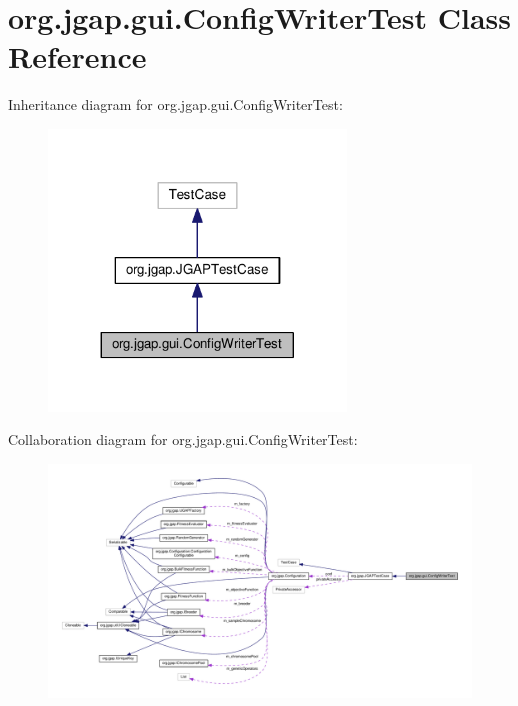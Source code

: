 \hypertarget{classorg_1_1jgap_1_1gui_1_1_config_writer_test}{\section{org.\-jgap.\-gui.\-Config\-Writer\-Test Class Reference}
\label{classorg_1_1jgap_1_1gui_1_1_config_writer_test}
}


Inheritance diagram for org.\-jgap.\-gui.\-Config\-Writer\-Test\-:
\nopagebreak
\begin{figure}[H]
\begin{center}
\leavevmode
\includegraphics[width=224pt]{classorg_1_1jgap_1_1gui_1_1_config_writer_test__inherit__graph}
\end{center}
\end{figure}


Collaboration diagram for org.\-jgap.\-gui.\-Config\-Writer\-Test\-:
\nopagebreak
\begin{figure}[H]
\begin{center}
\leavevmode
\includegraphics[width=350pt]{classorg_1_1jgap_1_1gui_1_1_config_writer_test__coll__graph}
\end{center}
\end{figure}
